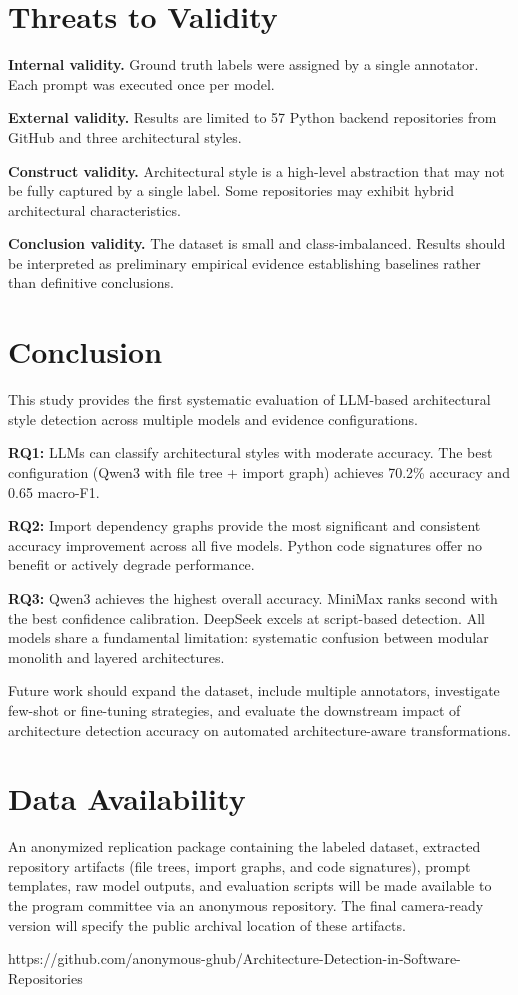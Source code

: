 \documentclass[runningheads]{llncs}
\begin{document}
\section{Threats to Validity}
\label{sec:threats}

\textbf{Internal validity.} Ground truth labels were assigned by a single annotator. Each prompt was executed once per model.

\textbf{External validity.} Results are limited to 57 Python backend repositories from GitHub and three architectural styles.

\textbf{Construct validity.} Architectural style is a high-level abstraction that may not be fully captured by a single label. Some repositories may exhibit hybrid architectural characteristics.

\textbf{Conclusion validity.} The dataset is small and class-imbalanced. Results should be interpreted as preliminary empirical evidence establishing baselines rather than definitive conclusions.

\section{Conclusion}
\label{sec:conclusion}

This study provides the first systematic evaluation of LLM-based architectural style detection across multiple models and evidence configurations.

\textbf{RQ1:} LLMs can classify architectural styles with moderate accuracy. The best configuration (Qwen3 with file tree + import graph) achieves 70.2\% accuracy and 0.65 macro-F1.

\textbf{RQ2:} Import dependency graphs provide the most significant and consistent accuracy improvement across all five models. Python code signatures offer no benefit or actively degrade performance.

\textbf{RQ3:} Qwen3 achieves the highest overall accuracy. MiniMax ranks second with the best confidence calibration. DeepSeek excels at script-based detection. All models share a fundamental limitation: systematic confusion between modular monolith and layered architectures.

Future work should expand the dataset, include multiple annotators, investigate few-shot or fine-tuning strategies, and evaluate the downstream impact of architecture detection accuracy on automated architecture-aware transformations.

\section*{Data Availability}

An anonymized replication package containing the labeled dataset, extracted repository artifacts (file trees, import graphs, and code signatures), prompt templates, raw model outputs, and evaluation scripts will be made available to the program committee via an anonymous repository. The final camera-ready version will specify the public archival location of these artifacts.

https://github.com/anonymous-ghub/Architecture-Detection-in-Software-Repositories



\end{document}
